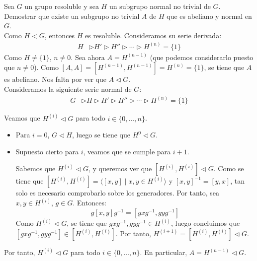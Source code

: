\begin{ejercicio}
    Sea $G$ un grupo resoluble y sea $H$ un subgrupo normal no trivial de $G$. Demostrar que existe un subgrupo no trivial $A$ de $H$ que es abeliano y normal en $G$.\\

    Como $H<G$, entonces $H$ es resoluble. Consideramos su serie derivada:
    \begin{align*}
        H &\rhd H' \rhd H'' \rhd \cdots \rhd H^{(n)} = \{1\}
    \end{align*}
    Como $H\neq \{1\}$, $n\neq 0$. Sea ahora $A=H^{(n-1)}$ (que podemos considerarlo puesto que $n\neq 0$). Como $[A,A]=[H^{(n-1)},H^{(n-1)}]=H^{(n)}=\{1\}$, se tiene que $A$ es abeliano. Nos falta por ver que $A\lhd G$.\\


    Consideramos la siguiente serie normal de $G$:
    \begin{align*}
        G &\rhd H\rhd H' \rhd H'' \rhd \cdots \rhd H^{(n)} = \{1\}
    \end{align*}
    
    Veamos que $H^{(i)}\lhd G$ para todo $i\in\{0,\ldots,n\}$.
    \begin{itemize}
        \item Para $i=0$, $G\lhd H$, luego se tiene que $H^0\lhd G$.
        \item Supuesto cierto para $i$, veamos que se cumple para $i+1$.
        
        Sabemos que $H^{(i)}\lhd G$, y queremos ver que $[H^{(i)},H^{(i)}]\lhd G$. Como se tiene que $[H^{(i)},H^{(i)}]=\langle [x,y] \mid x,y\in H^{(i)}\rangle$ y $[x,y]^{-1}=[y,x]$, tan solo es necesario comprobarlo sobre los generadores. Por tanto, sea $x,y\in H^{(i)}$, $g\in G$. Entonces:
        \begin{equation*}
            g[x,y]g^{-1} = [gxg^{-1},gyg^{-1}]
        \end{equation*}
        Como $H^{(i)}\lhd G$, se tiene que $gxg^{-1},gyg^{-1}\in H^{(i)}$, luego concluimos que $[gxg^{-1},gyg^{-1}]\in [H^{(i)},H^{(i)}]$. Por tanto, $H^{(i+1)}= [H^{(i)},H^{(i)}]\lhd G$.
    \end{itemize}

    Por tanto, $H^{(i)}\lhd G$ para todo $i\in\{0,\ldots,n\}$. En particular, $A=H^{(n-1)}\lhd G$.
\end{ejercicio}

